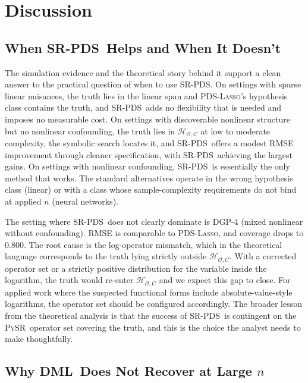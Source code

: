 \documentclass[11pt, a4paper]{article}
\theoremstyle{plain}
\theoremstyle{definition}
\theoremstyle{remark}
\newcommand{\lasso}{\textsc{Lasso}}
\newcommand{\pds}{\textsc{PDS}}
\newcommand{\dml}{\textsc{DML}}
\newcommand{\pysr}{\textsc{PySR}}
\newcommand{\epds}{\textsc{SR-PDS}}
\newcommand{\Hcal}{\mathcal{H}_{\mathcal{O}, C}}
\begin{document}
\section{Discussion}
\label{sec:discussion}

\subsection{When \epds\ Helps and When It Doesn't}

The simulation evidence and the theoretical story behind it
support a clean answer to the practical question of when to use
\epds. On settings with sparse linear nuisances, the truth lies
in the linear span and \pds-\lasso's hypothesis class contains
the truth, and \epds\ adds no flexibility that is needed and
imposes no measurable cost. On settings with discoverable nonlinear
structure but no nonlinear confounding, the truth lies in
$\Hcal$ at low to moderate complexity, the symbolic search
locates it, and \epds\ offers a modest RMSE improvement through
cleaner specification, with \epds\ achieving the
largest gains. On settings with nonlinear confounding, \epds\
is essentially the only method that works. The
standard alternatives operate in the wrong hypothesis class
(linear) or with a class whose sample-complexity requirements
do not bind at applied $n$ (neural networks).

The setting where \epds\ does not clearly dominate is DGP-4
(mixed nonlinear without confounding). RMSE is comparable to
\pds-\lasso, and coverage drops to $0.800$. The root cause is
the log-operator mismatch, which in the theoretical language
corresponds to the truth lying strictly outside $\Hcal$. With a
corrected operator set or a strictly positive distribution for
the variable inside the logarithm, the truth would re-enter
$\Hcal$ and we expect this gap to close. For applied work where
the suspected functional forms include absolute-value-style
logarithms, the operator set should be configured accordingly.
The broader lesson from the theoretical analysis is that the
success of \epds\ is contingent on the \pysr\ operator set
covering the truth, and this is the choice the analyst needs to
make thoughtfully.

\subsection{Why \dml\ Does Not Recover at Large $n$}
\end{document}
